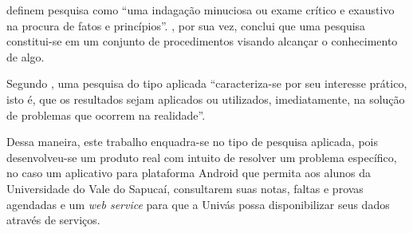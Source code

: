 	
	\par {} definem pesquisa como “uma indagação minuciosa
ou exame crítico e exaustivo na procura de fatos e princípios”.
, por sua vez, conclui que uma pesquisa constitui-se
em um conjunto de procedimentos visando alcançar o conhecimento de algo.

	\par Segundo , uma pesquisa do tipo aplicada
“caracteriza-se por seu interesse prático, isto é, que os resultados sejam
aplicados ou utilizados, imediatamente, na solução de problemas que ocorrem na
realidade”.

	\par Dessa maneira, este trabalho enquadra-se no tipo de pesquisa aplicada,
pois desenvolveu-se um produto real com intuito de resolver um problema específico,
no caso um aplicativo para plataforma Android que permita aos alunos da Universidade
do Vale do Sapucaí, consultarem suas notas, faltas e provas agendadas e um
\textit{web service} para que a Univás possa disponibilizar seus dados através
de serviços.
